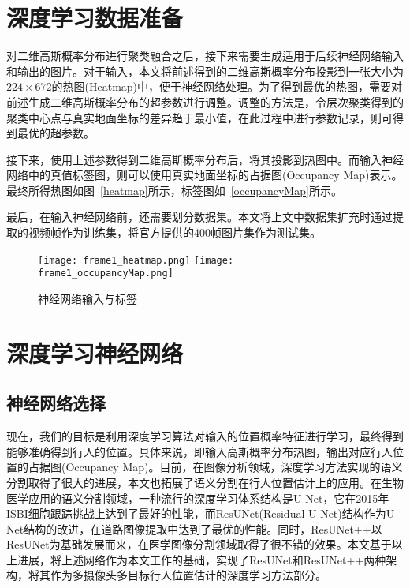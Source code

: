 \section{深度学习数据准备}

对二维高斯概率分布进行聚类融合之后，接下来需要生成适用于后续神经网络输入和输出的图片。对于输入，本文将前述得到的二维高斯概率分布投影到一张大小为$224\times672$的热图(Heatmap)中，便于神经网络处理。为了得到最优的热图，需要对前述生成二维高斯概率分布的超参数进行调整。调整的方法是，令层次聚类得到的聚类中心点与真实地面坐标的差异趋于最小值，在此过程中进行参数记录，则可得到最优的超参数。

接下来，使用上述参数得到二维高斯概率分布后，将其投影到热图中。而输入神经网络中的真值标签图，则可以使用真实地面坐标的占据图(Occupancy Map)\cite{fleuret2007multicamera}表示。最终所得热图如图~\ref{heatmap}所示，标签图如~\ref{occupancyMap}所示。

最后，在输入神经网络前，还需要划分数据集。本文将上文中数据集扩充时通过提取的视频帧作为训练集，将官方提供的400帧图片集作为测试集。

\begin{figure}
    \centering
      {\texttt{[image: frame1\_heatmap.png]}}
      \quad
      {\texttt{[image: frame1\_occupancyMap.png]}}
    \caption{神经网络输入与标签}
    \label{inputs_outputs}
\end{figure}



\section{深度学习神经网络}

\subsection{神经网络选择}

现在，我们的目标是利用深度学习算法对输入的位置概率特征进行学习，最终得到能够准确得到行人的位置。具体来说，即输入高斯概率分布热图，输出对应行人位置的占据图(Occupancy Map)。目前，在图像分析领域，深度学习方法实现的语义分割取得了很大的进展\cite{2016V, 2015U, 2017Road}，本文也拓展了语义分割在行人位置估计上的应用。在生物医学应用的语义分割领域，一种流行的深度学习体系结构是U-Net\cite{2015U}，它在2015年ISBI细胞跟踪挑战上达到了最好的性能，而ResUNet(Residual U-Net)\cite{2017Road}结构作为U-Net结构的改进，在道路图像提取中达到了最优的性能。同时，ResUNet++\cite{2019ResUNet}以ResUNet为基础发展而来，在医学图像分割领域取得了很不错的效果。本文基于以上进展，将上述网络作为本文工作的基础，实现了ResUNet和ResUNet++两种架构，将其作为多摄像头多目标行人位置估计的深度学习方法部分。

